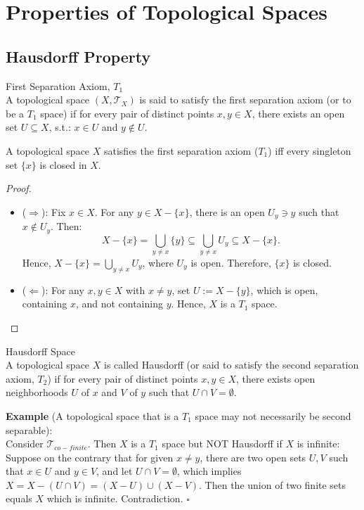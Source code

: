 \chapter{Properties of Topological Spaces}

\section{Hausdorff Property}

\begin{definition}{First Separation Axiom, $T_1$}\\
A topological space $(X,\mathcal{T}_X)$ is said to satisfy the first separation axiom (or to be a $T_1$ space) if for every pair of distinct points $x,y \in X$, there exists an open set $U \subseteq X$, s.t.: $x \in U$ and $y \notin U$.
\end{definition}

\begin{proposition}
A topological space $X$ satisfies the first separation axiom ($T_1$) iff every singleton set $\{x\}$ is closed in $X$. 
\end{proposition}

\begin{proof}
    \begin{itemize}
        \item ($\Rightarrow$): Fix $x\in X$. For any $y \in X-\{x\}$, there is an open $U_y \ni y$ such that $x\notin U_y$. Then:
        $$X- \{x\} = \bigcup_{y\neq x}\{y\} \subseteq \bigcup _{y \neq x} U_y \subseteq X- \{x\}.$$
        Hence, $X- \{x\} = \bigcup _{y \neq x} U_y$, where $U_y$ is open. Therefore, $\{x\}$ is closed.
        \item ($\Leftarrow$): For any $x,y \in X$ with $x\neq y$, set $U:= X-\{y\}$, which is open, containing $x$, and not containing $y$. Hence, $X$ is a $T_1$ space.
    \end{itemize}
\end{proof}

\begin{definition}{Hausdorff Space}\\
A topological space $X$ is called Hausdorff (or said to satisfy the second separation axiom, $T_2$) if for every pair of distinct points $x,y \in X$, there exists open neighborhoods $U$ of $x$ and $V$ of $y$ such that $U\cap V= \emptyset$.
\end{definition}

\noindent\textbf{Example} (A topological space that is a $T_1$ space may not necessarily be second separable):\\
Consider $\mathcal{T}_{co-finite}$. Then $X$ is a $T_1$ space but NOT Hausdorff if $X$ is infinite:\\
Suppose on the contrary that for given $x \neq y$, there are two open sets $U,V$ such that $x\in U$ and $y\in V$, and let $U\cap V=\emptyset$, which implies $X = X- (U\cap V) = (X-U) \cup (X-V)$. Then the union of two finite sets equals $X$ which is infinite. Contradiction. \hfill$\square$

